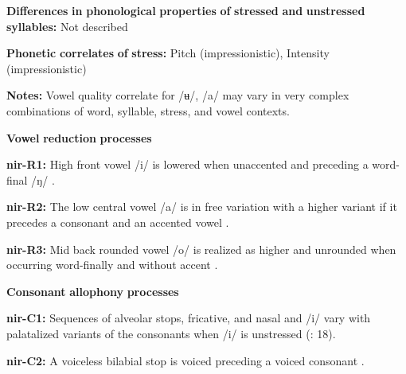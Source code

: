 \documentclass[output=paper]{langsci/langscibook}
\begin{document}
\begin{styleBody}
\textbf{Differences} \textbf{in} \textbf{phonological} \textbf{properties} \textbf{of} \textbf{stressed} \textbf{and} \textbf{unstressed} \textbf{syllables:} Not described
\end{styleBody}

\begin{styleBody}
\textbf{Phonetic} \textbf{correlates} \textbf{of} \textbf{stress:} Pitch (impressionistic), Intensity (impressionistic)
\end{styleBody}

\begin{styleBody}
\textbf{Notes:} Vowel quality correlate for /ʉ/, /a/ may vary in very complex combinations of word, syllable, stress, and vowel contexts.
\end{styleBody}

\begin{styleBody}
\textbf{Vowel} \textbf{reduction} \textbf{processes}
\end{styleBody}

\begin{styleBody}
\textbf{nir-R1:} High front vowel /i/ is lowered when unaccented and preceding a word-final /ŋ/ \citep[10]{Anceaux1965}.
\end{styleBody}

\begin{styleBody}
\textbf{nir-R2:} The low central vowel /a/ is in free variation with a higher variant if it precedes a consonant and an accented vowel \citep[13]{Anceaux1965}.
\end{styleBody}

\begin{styleBody}
\textbf{nir-R3:} Mid back rounded vowel /o/ is realized as higher and unrounded when occurring word-finally and without accent \citep[14]{Anceaux1965}.
\end{styleBody}

\begin{styleBody}
\textbf{Consonant} \textbf{allophony} \textbf{processes}
\end{styleBody}

\begin{styleBody}
\textbf{nir-C1:} Sequences of alveolar stops, fricative, and nasal and /i/ vary with palatalized variants of the consonants when /i/ is unstressed (\citealt{MayMay1981}: 18).
\end{styleBody}

\begin{styleBody}
\textbf{nir-C2:} A voiceless bilabial stop is voiced preceding a voiced consonant \citep[30]{May1997}.
\end{styleBody}
\end{document}
